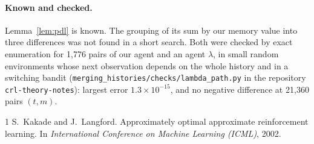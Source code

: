 \documentclass{article}
\theoremstyle{definition}
\numberwithin{equation}{section}
\begin{document}
\paragraph{Known and checked.} Lemma~\ref{lem:pdl} is known. The grouping of its sum by our memory value into three differences was not found in a short search. Both were checked by exact enumeration for 1{,}776 pairs of our agent and an agent $\lambda$, in small random environments whose next observation depends on the whole history and in a switching bandit (\texttt{merging\_histories/checks/lambda\_path.py} in the repository \texttt{crl-theory-notes}): largest error $1.3\times10^{-15}$, and no negative difference at 21{,}360 pairs $(t,m)$.

\begin{thebibliography}{1}
S.~Kakade and J.~Langford.
\newblock Approximately optimal approximate reinforcement learning.
\newblock In \emph{International Conference on Machine Learning (ICML)}, 2002.
\end{thebibliography}
\end{document}
